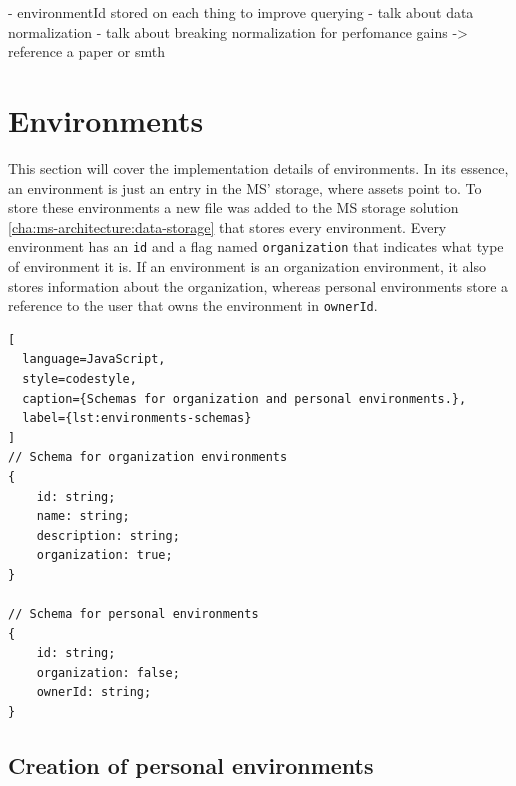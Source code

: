 - environmentId stored on each thing to improve querying
- talk about data normalization
- talk about breaking normalization for perfomance gains -> reference a paper or smth

\section{Environments}


This section will cover the implementation details of environments.
In its essence, an environment is just an entry in the MS' storage, where assets point to.
To store these environments a new file was added to the MS storage solution
\ref{cha:ms-architecture:data-storage} that stores every environment.
Every environment has an \lstinline{id} and a flag named \lstinline{organization} that
indicates what type of environment it is.
If an environment is an organization environment, it also stores information about the
organization,
whereas personal environments store a reference to the user that owns the environment in
\lstinline{ownerId}.

\begin{lstlisting}[
  language=JavaScript,
  style=codestyle,
  caption={Schemas for organization and personal environments.},
  label={lst:environments-schemas}
]
// Schema for organization environments
{
    id: string;
    name: string;
    description: string;
    organization: true;
}

// Schema for personal environments
{
    id: string;
    organization: false;
    ownerId: string;
}
\end{lstlisting}

\subsection{Creation of personal environments}



